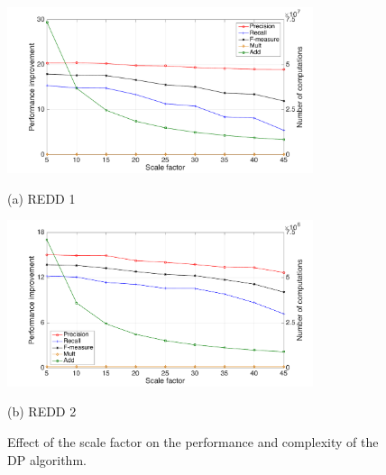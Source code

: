 \begin{figure}[htb]
\begin{minipage}[b]{1\linewidth}
  \centering
  \centerline{\includegraphics[width=0.8\textwidth]{./chapters/chapter5/images/R1_scale.pdf}}
  \centerline{(a) REDD 1}\medskip
\end{minipage}
\hfill
\begin{minipage}[b]{1\linewidth}
  \centering
  \centerline{\includegraphics[width=0.8\textwidth]{./chapters/chapter5/images/R2_scale.pdf}}
  \centerline{(b) REDD 2}\medskip
\end{minipage}
\caption{Effect of the scale factor on the performance and complexity of the DP algorithm.}
\label{fig:SR10}
%
\end{figure}

